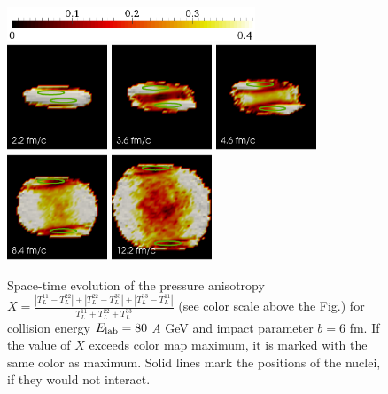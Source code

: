 \begin{figure}
  \includegraphics[height = 1cm]{plots/thermalization_urqmd/E80b6_x_paraview_color_legend.png} \\
  \includegraphics[width = 3.0cm]{plots/thermalization_urqmd/E80b6_x_paraview_t2_2fm.png}
  \includegraphics[width = 3.0cm]{plots/thermalization_urqmd/E80b6_x_paraview_t3_6fm.png}
  \includegraphics[width = 3.0cm]{plots/thermalization_urqmd/E80b6_x_paraview_t4_6fm.png}
  \includegraphics[width = 3.0cm]{plots/thermalization_urqmd/E80b6_x_paraview_t8_4fm.png}
  \includegraphics[width = 3.0cm]{plots/thermalization_urqmd/E80b6_x_paraview_t12_2fm.png}
  \caption{Space-time evolution of the pressure anisotropy $X =
           \frac{|T_L^{11}-T_L^{22}|+|T_L^{22}-T_L^{33}|+|T_L^{33}-T_L^{11}|}
           {T_L^{11}+T_L^{22}+T_L^{33}}$
           (see color scale above the Fig.) for collision energy
           $E_\mathrm{lab} = 80$ \emph{A} GeV and impact parameter $b = 6$ fm.
           If the value of $X$ exceeds color map maximum, it is marked with the same
           color as maximum. Solid lines mark the positions of the nuclei, if they
           would not interact.}
  \label{FIG:x_paraview_space_time_evolution}
\end{figure}

